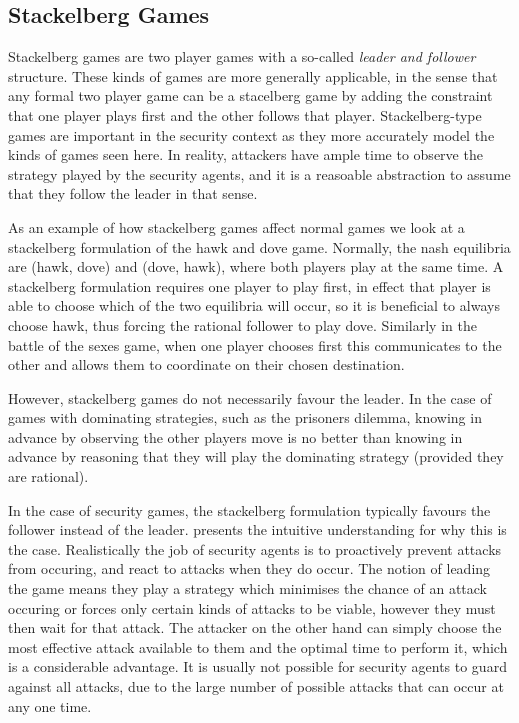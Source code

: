 \documentclass{article}
\begin{document}
\subsection{Stackelberg Games}

Stackelberg games are two player games with a so-called {\em leader and follower} structure.
These kinds of games are more generally applicable, in the sense that any formal two player game can be a stacelberg game by adding the constraint that one player plays first and the other follows that player.
Stackelberg-type games are important in the security context as they more accurately model the kinds of games seen here.
In reality, attackers have ample time to observe the strategy played by the security agents, and it is a reasoable abstraction to assume that they follow the leader in that sense.

As an example of how stackelberg games affect normal games we look at a stackelberg formulation of the hawk and dove game.
Normally, the nash equilibria are (hawk, dove) and (dove, hawk), where both players play at the same time.
A stackelberg formulation requires one player to play first, in effect that player is able to choose which of the two equilibria will occur, so it is beneficial to always choose hawk, thus forcing the rational follower to play dove.
Similarly in the battle of the sexes game, when one player chooses first this communicates to the other and allows them to coordinate on their chosen destination.

However, stackelberg games do not necessarily favour the leader.
In the case of games with dominating strategies, such as the prisoners dilemma, knowing in advance by observing the other players move is no better than knowing in advance by reasoning that they will play the dominating strategy (provided they are rational).

In the case of security games, the stackelberg formulation typically favours the follower instead of the leader.
\cite{stackelberg} presents the intuitive understanding for why this is the case.
Realistically the job of security agents is to proactively prevent attacks from occuring, and react to attacks when they do occur.
The notion of leading the game means they play a strategy which minimises the chance of an attack occuring or forces only certain kinds of attacks to be viable, however they must then wait for that attack.
The attacker on the other hand can simply choose the most effective attack available to them and the optimal time to perform it, which is a considerable advantage.
It is usually not possible for security agents to guard against all attacks, due to the large number of possible attacks that can occur at any one time.
\end{document}
